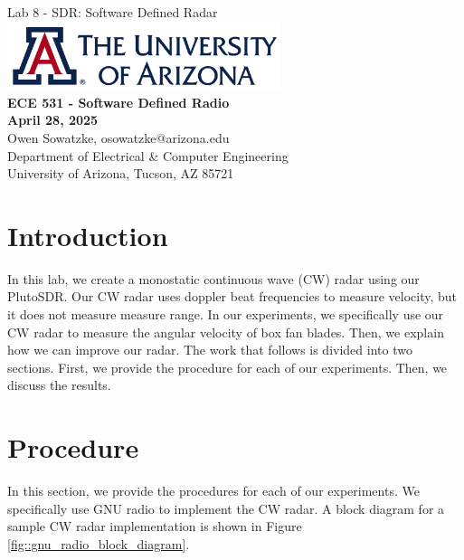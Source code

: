 \documentclass{article}
\begin{document}
\begin{titlepage}
	\centering
	{\huge Lab 8 - SDR: Software Defined Radar}\\[0.25 in]
	\includegraphics[width=0.6\textwidth]{ua_logo.png}\\[0.25 in]
	{\large \textbf{ECE 531 - Software Defined Radio\\[0.25 in]
	April 28, 2025\\[0.25 in]}}
	{\large Owen Sowatzke, osowatzke@arizona.edu\\[0.05 in]
	Department of Electrical \& Computer Engineering\\[0.05 in]
	University of Arizona, Tucson, AZ 85721\\[0.5 in]}
	\hypersetup{linkcolor=navy-blue}
	\noindent\hrulefill
	\tableofcontents
	\noindent\hrulefill
\end{titlepage}


\section{Introduction}

In this lab, we create a monostatic continuous wave (CW) radar using our PlutoSDR. Our CW radar uses doppler beat frequencies to measure velocity, but it does not measure measure range. In our experiments, we specifically use our CW radar to measure the angular velocity of box fan blades. Then, we explain how we can improve our radar. The work that follows is divided into two sections. First, we provide the procedure for each of our experiments. Then, we discuss the results. 

\section{Procedure}

In this section, we provide the procedures for each of our experiments. We specifically use GNU radio to implement the CW radar. A block diagram for a sample CW radar implementation is shown in Figure \ref{fig::gnu_radio_block_diagram}.
\end{document}
